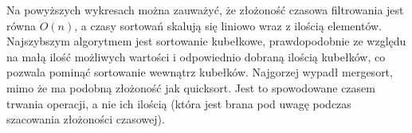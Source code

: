 \documentclass{article}
\begin{document}
    Na powyższych wykresach można zauważyć, że złożoność czasowa filtrowania jest równa $O\left(n\right)$, a czasy sortowań skalują się liniowo wraz z ilością elementów. Najszybszym algorytmem jest sortowanie kubełkowe, prawdopodobnie ze względu na małą ilość możliwych wartości i odpowiednio dobraną ilością kubełków, co pozwala pominąć sortowanie wewnątrz kubełków. Najgorzej wypadł mergesort, mimo że ma podobną złożoność jak quicksort. Jest to spowodowane czasem trwania operacji, a nie ich ilością (która jest brana pod uwagę podczas szacowania złożoności czasowej).
    
\end{document}

